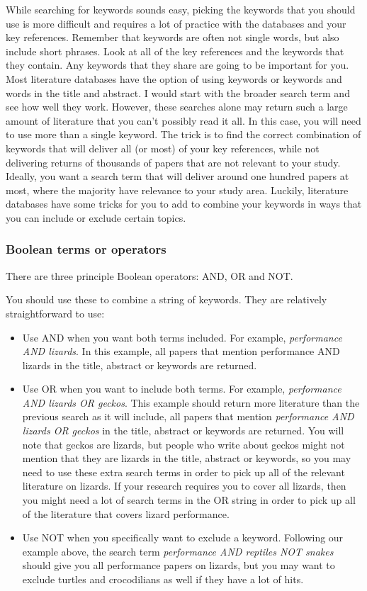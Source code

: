 \documentclass[
]{krantz}
\providecommand{\tightlist}{%
  \setlength{\itemsep}{0pt}\setlength{\parskip}{0pt}}
\begin{document}
While searching for keywords sounds easy, picking the keywords that you should use is more difficult and requires a lot of practice with the databases and your key references. Remember that keywords are often not single words, but also include short phrases. Look at all of the key references and the keywords that they contain. Any keywords that they share are going to be important for you. Most literature databases have the option of using keywords or keywords and words in the title and abstract. I would start with the broader search term and see how well they work. However, these searches alone may return such a large amount of literature that you can't possibly read it all. In this case, you will need to use more than a single keyword. The trick is to find the correct combination of keywords that will deliver all (or most) of your key references, while not delivering returns of thousands of papers that are not relevant to your study. Ideally, you want a search term that will deliver around one hundred papers at most, where the majority have relevance to your study area. Luckily, literature databases have some tricks for you to add to combine your keywords in ways that you can include or exclude certain topics.

\hypertarget{boolean-terms-or-operators}{%
\subsubsection{Boolean terms or operators}\label{boolean-terms-or-operators}}

There are three principle Boolean operators: AND, OR and NOT.

You should use these to combine a string of keywords. They are relatively straightforward to use:

\begin{itemize}
\tightlist
\item
  Use AND when you want both terms included. For example, \emph{performance AND lizards}. In this example, all papers that mention performance AND lizards in the title, abstract or keywords are returned.
\item
  Use OR when you want to include both terms. For example, \emph{performance AND lizards OR geckos}. This example should return more literature than the previous search as it will include, all papers that mention \emph{performance AND lizards OR geckos} in the title, abstract or keywords are returned. You will note that geckos are lizards, but people who write about geckos might not mention that they are lizards in the title, abstract or keywords, so you may need to use these extra search terms in order to pick up all of the relevant literature on lizards. If your research requires you to cover all lizards, then you might need a lot of search terms in the OR string in order to pick up all of the literature that covers lizard performance.
\item
  Use NOT when you specifically want to exclude a keyword. Following our example above, the search term \emph{performance AND reptiles NOT snakes} should give you all performance papers on lizards, but you may want to exclude turtles and crocodilians as well if they have a lot of hits.
\end{itemize}
\end{document}
